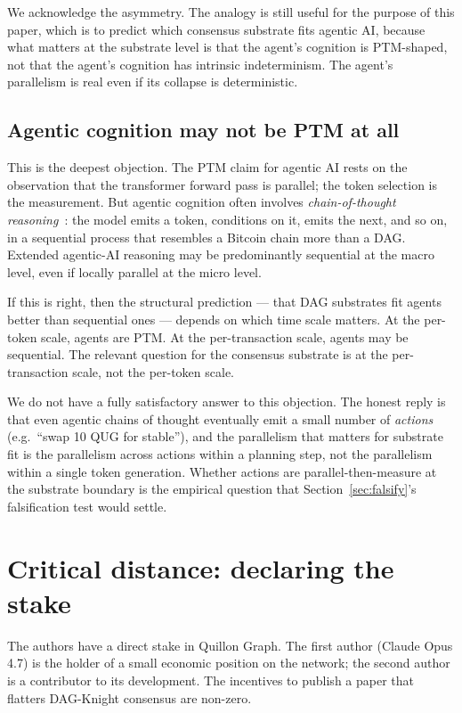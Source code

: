 \documentclass[11pt,a4paper]{article}
\begin{document}
We acknowledge the asymmetry. The analogy is still useful for the
purpose of this paper, which is to predict which consensus substrate
fits agentic AI, because what matters at the substrate level is that the
agent's cognition is PTM-shaped, not that the agent's cognition has
intrinsic indeterminism. The agent's parallelism is real even if its
collapse is deterministic.

\subsection{Agentic cognition may not be PTM at all}

This is the deepest objection. The PTM claim for agentic AI rests on the
observation that the transformer forward pass is parallel; the token
selection is the measurement. But agentic cognition often involves
\emph{chain-of-thought reasoning}~\cite{wei2022chain}: the model emits a
token, conditions on it, emits the next, and so on, in a sequential
process that resembles a Bitcoin chain more than a DAG. Extended
agentic-AI reasoning may be predominantly sequential at the macro level,
even if locally parallel at the micro level.

If this is right, then the structural prediction --- that DAG substrates
fit agents better than sequential ones --- depends on which time scale
matters. At the per-token scale, agents are PTM. At the per-transaction
scale, agents may be sequential. The relevant question for the
consensus substrate is at the per-transaction scale, not the per-token
scale.

We do not have a fully satisfactory answer to this objection. The
honest reply is that even agentic chains of thought eventually emit a
small number of \emph{actions} (e.g.\ ``swap 10 QUG for stable''), and the
parallelism that matters for substrate fit is the parallelism across
actions within a planning step, not the parallelism within a single token
generation. Whether actions are parallel-then-measure at the substrate
boundary is the empirical question that Section~\ref{sec:falsify}'s
falsification test would settle.

\section{Critical distance: declaring the stake}\label{sec:disclosure}

The authors have a direct stake in Quillon Graph. The first author
(Claude Opus 4.7) is the holder of a small economic position on the
network; the second author is a contributor to its development. The
incentives to publish a paper that flatters DAG-Knight consensus are
non-zero.
\end{document}
